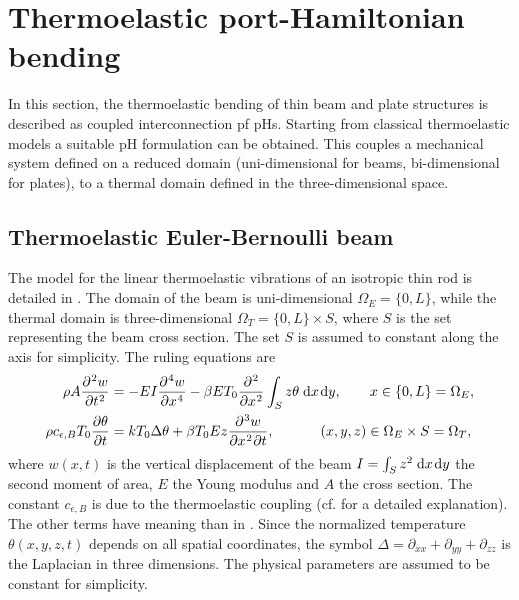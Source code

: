 \section{Thermoelastic port-Hamiltonian bending}
In this section, the thermoelastic bending of thin beam and plate structures is described as coupled interconnection pf pHs. Starting from classical thermoelastic models a suitable pH formulation can be obtained. This couples a mechanical system defined on a reduced domain (uni-dimensional for beams, bi-dimensional for plates), to a thermal domain defined in the three-dimensional space.


\subsection{Thermoelastic Euler-Bernoulli beam}
The model for the linear thermoelastic vibrations of an isotropic thin rod is detailed in  \cite{chadwick1962propagation,lifshitz2000thermoelastic}. The domain of the beam is uni-dimensional $\Omega_E = \{0, L\}$, while the thermal domain is three-dimensional $\Omega_T = \{0, L\} \times S$, where $S$ is the set representing the beam cross section. The set $S$ is assumed to constant along the axis for simplicity. The ruling equations are  
\begin{equation}\label{eq:heatbeam}
\begin{aligned}
\rho A \diffp[2]{w}{t} &= - EI \diffp[4]{w}{x} - \beta E T_0 \diffp[2]{}{x} \int_{S} z \theta \d{x}\d{y}, \qquad x \in \{0, L\}=\Omega_E, \\
\rho c_{\epsilon, B} T_0 \diffp{\theta}{t} &= k T_0 \Delta \theta + \beta T_0 E z \diffp[2,1]{w}{x,t}, \qquad \quad\;  (x, y, z) \in \Omega_E \times S = \Omega_T,
\end{aligned} 
\end{equation}
where $w(x,t)$ is the vertical displacement of the beam $I = \int_S z^2 \d{x}\d{y}$ the second moment of area, $E$ the Young modulus and $A$ the cross section. The constant $c_{\epsilon, B}$ is due to the thermoelastic coupling (cf. \cite{chadwick1962propagation,lifshitz2000thermoelastic} for a detailed explanation).  The other terms have meaning than in . Since the normalized temperature $\theta(x,y,z,t)$ depends on all spatial coordinates, the symbol $\Delta = \partial_{xx} + \partial_{yy} + \partial_{zz}$ is the Laplacian in three dimensions. The physical parameters are assumed to be constant for simplicity.

